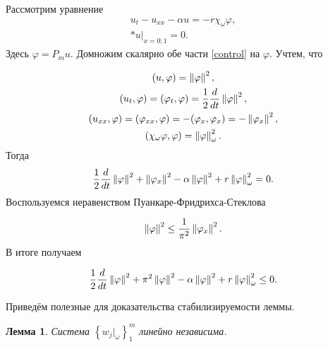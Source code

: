 Рассмотрим уравнение
\begin{gather}\label{control}
    u_t - u_{xx} - \alpha u = -r\chi_{\omega}\varphi,\\*
    u|_{x = 0;1} = 0.
\end{gather}
Здесь $\varphi = P_mu$. Домножим скалярно обе части \eqref{control} на
$\varphi$. Учтем, что

\begin{gather*}
    (u, \varphi) = \left\lVert\varphi\right\rVert^2,\\*
    (u_t, \varphi) = (\varphi_t, \varphi) = \frac{1}{2} \frac{d}{dt}
    \left\lVert\varphi\right\rVert^2, \\*
    (u_{xx}, \varphi) = (\varphi_{xx}, \varphi) = -(\varphi_x, \varphi_x) = -
    \left\lVert\varphi_x\right\rVert^2, \\*
    (\chi_{\omega}\varphi, \varphi) = \left\lVert\varphi\right\rVert^2_{\omega}.
\end{gather*}
Тогда
\begin{equation*}
    \frac{1}{2} \frac{d}{dt} \left\lVert\varphi\right\rVert^2  + \left\lVert\varphi_x\right\rVert^2 - 
    \alpha \left\lVert\varphi\right\rVert^2 + r \left\lVert\varphi\right\rVert^2_{\omega} = 0.
\end{equation*}
Воспользуемся неравенством Пуанкаре-Фридрихса-Стеклова

\begin{equation}
    \left\lVert\varphi\right\rVert^2 \le \frac{1}{\pi^2} \left\lVert\varphi_x\right\rVert^2.
\end{equation}
В итоге получаем

\begin{equation}
    \frac{1}{2} \frac{d}{dt} \left\lVert\varphi\right\rVert^2 + \pi^2 \left\lVert\varphi\right\rVert^2 - 
    \alpha \left\lVert\varphi\right\rVert^2 + r \left\lVert\varphi\right\rVert^2_{\omega} \le 0.
\end{equation}

Приведём полезные для доказательства стабилизируемости леммы.

\newtheorem{lemma}{Лемма}

\begin{lemma}\label{util_lemma}
    Система $\left\{ w_j|_{\omega} \right\}^m_1$ линейно независима.
\end{lemma}

